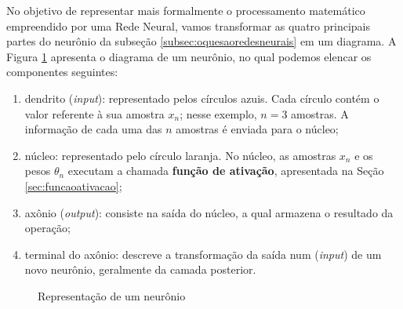 No objetivo de representar mais formalmente o processamento matemático empreendido por uma Rede Neural, vamos transformar as quatro principais partes do neurônio da subseção \ref{subsec:oquesaoredesneurais} em um diagrama. A Figura \ref{fg:rede_neural_simples} apresenta o diagrama de um neurônio, no qual podemos elencar os componentes seguintes:
\begin{enumerate}
 \item dendrito (\textit{input}): representado pelos círculos azuis. Cada círculo contém o valor referente à sua amostra $x_n$; nesse exemplo, $n = 3$ amostras. A informação de cada uma das $n$ amostras é enviada para o núcleo;
    \item núcleo: representado pelo círculo laranja. No núcleo, as amostras $x_n$ e os pesos $\theta_n$ executam a chamada \textbf{função de ativação}, apresentada na Seção \ref{sec:funcaoativacao};
   
    \item axônio (\textit{output}): consiste na saída do núcleo, a qual armazena o resultado da operação;
    \item terminal do axônio: descreve a transformação da saída num (\textit{input}) de um novo neurônio, geralmente da camada posterior.
    
\end{enumerate}


\begin{figure}
\centering
\large
{}
\caption{Representação de um neurônio}
\label{fg:rede_neural_simples}
\end{figure}

